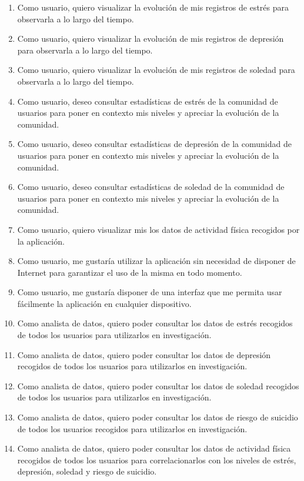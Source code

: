 \begin{enumerate}[label=\textbf{\texttt{RU-\arabic*}}]
            \item Como usuario, quiero visualizar la evolución de mis registros de estrés para observarla a lo largo del tiempo.
            \item Como usuario, quiero visualizar la evolución de mis registros de depresión para observarla a lo largo del tiempo.
            \item Como usuario, quiero visualizar la evolución de mis registros de soledad para observarla a lo largo del tiempo.
            \item Como usuario, deseo consultar estadísticas de estrés de la comunidad de usuarios para poner en contexto mis niveles y apreciar la evolución de la comunidad.
            \item Como usuario, deseo consultar estadísticas de depresión de la comunidad de usuarios para poner en contexto mis niveles y apreciar la evolución de la comunidad.
            \item Como usuario, deseo consultar estadísticas de soledad de la comunidad de usuarios para poner en contexto mis niveles y apreciar la evolución de la comunidad.
            \item Como usuario, quiero visualizar mis los datos de actividad física recogidos por la aplicación.
            \item Como usuario, me gustaría utilizar la aplicación sin necesidad de disponer de Internet para garantizar el uso de la misma en todo momento.
            \item Como usuario, me gustaría disponer de una interfaz que me permita usar fácilmente la aplicación en cualquier dispositivo.
            \item Como analista de datos, quiero poder consultar los datos de estrés recogidos de todos los usuarios para utilizarlos en investigación.
            \item Como analista de datos, quiero poder consultar los datos de depresión recogidos  de todos los usuarios para utilizarlos en investigación.
            \item Como analista de datos, quiero poder consultar los datos de soledad recogidos de todos los usuarios  para utilizarlos en investigación.
            \item Como analista de datos, quiero poder consultar los datos de riesgo de suicidio  de todos los usuarios recogidos para utilizarlos en investigación.
            \item Como analista de datos, quiero poder consultar los datos de actividad física recogidos de todos los usuarios para correlacionarlos con los niveles de estrés, depresión, soledad y riesgo de suicidio.
        \end{enumerate}
    
